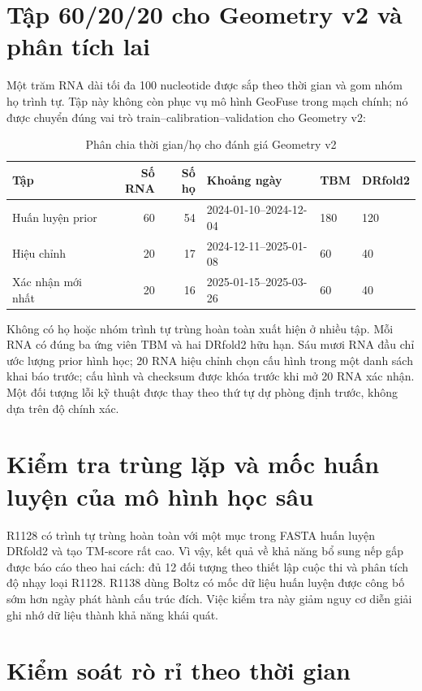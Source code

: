\documentclass[12pt,a4paper,oneside]{report}
\begin{document}
\section{Tập 60/20/20 cho Geometry v2 và phân tích lai}

Một trăm RNA dài tối đa 100 nucleotide được sắp theo thời gian và gom nhóm họ trình tự.
Tập này không còn phục vụ mô hình GeoFuse trong mạch chính; nó được chuyển đúng vai trò
train--calibration--validation cho Geometry v2:

\begin{table}[H]
\centering
\caption{Phân chia thời gian/họ cho đánh giá Geometry v2}
\begin{tabular}{lrrlll}
\toprule
Tập & Số RNA & Số họ & Khoảng ngày & TBM & DRfold2\\
\midrule
Huấn luyện prior & 60 & 54 & 2024-01-10--2024-12-04 & 180 & 120\\
Hiệu chỉnh & 20 & 17 & 2024-12-11--2025-01-08 & 60 & 40\\
Xác nhận mới nhất & 20 & 16 & 2025-01-15--2025-03-26 & 60 & 40\\
\bottomrule
\end{tabular}
\end{table}

Không có họ hoặc nhóm trình tự trùng hoàn toàn xuất hiện ở nhiều tập. Mỗi RNA có đúng ba
ứng viên TBM và hai DRfold2 hữu hạn. Sáu mươi RNA đầu chỉ ước lượng prior hình học; 20
RNA hiệu chỉnh chọn cấu hình trong một danh sách khai báo trước; cấu hình và checksum
được khóa trước khi mở 20 RNA xác nhận. Một đối tượng lỗi kỹ thuật được thay theo thứ tự
dự phòng định trước, không dựa trên độ chính xác.

\section{Kiểm tra trùng lặp và mốc huấn luyện của mô hình học sâu}

R1128 có trình tự trùng hoàn toàn với một mục trong FASTA huấn luyện DRfold2 và tạo
TM-score rất cao. Vì vậy, kết quả về khả năng bổ sung nếp gấp được báo cáo theo hai cách:
đủ 12 đối tượng theo thiết lập cuộc thi và phân tích độ nhạy loại R1128. R1138 dùng Boltz
có mốc dữ liệu huấn luyện được công bố sớm hơn ngày phát hành cấu trúc đích. Việc kiểm
tra này giảm nguy cơ diễn giải ghi nhớ dữ liệu thành khả năng khái quát.

\section{Kiểm soát rò rỉ theo thời gian}
\end{document}
